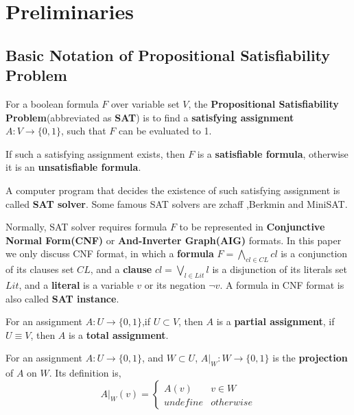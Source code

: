 \documentclass[journal]{IEEEtran}
\begin{document}
\section{Preliminaries}\label{sec_pre}

\subsection{Basic Notation of Propositional Satisfiability Problem}
For a boolean formula $F$ over variable set $V$,
the \textbf{Propositional Satisfiability Problem}(abbreviated as \textbf{SAT}) is to find a \textbf{satisfying assignment} $A:V\to \{0,1\}$,
such that $F$ can be evaluated to 1.

If such a satisfying assignment exists, then $F$ is a \textbf{satisfiable formula},
otherwise it is an \textbf{unsatisfiable formula}.

A computer program that decides the existence of such satisfying assignment is called \textbf{SAT solver}.
Some famous SAT solvers are zchaff\cite{CHAFF} ,Berkmin\cite{BERKMIN} and MiniSAT\cite{EXTSAT}.

Normally,
SAT solver requires formula $F$ to be represented in \textbf{Conjunctive Normal Form(CNF)} or \textbf{And-Inverter Graph(AIG)} formats.
In this paper we only discuss CNF format,
in which a \textbf{formula} $F=\bigwedge_{cl\in CL}cl$ is a conjunction of its clauses set $CL$,
and a \textbf{clause} $cl=\bigvee_{l\in Lit}l$ is a disjunction of its literals set $Lit$,
and a \textbf{literal} is a variable $v$ or its negation $\neg v$.
A formula in CNF format is also called \textbf{SAT instance}.

For an assignment $A:U\to \{0,1\}$,if $U\subset V$, then $A$ is a \textbf{partial assignment},
if $U\equiv V$, then $A$ is a \textbf{total assignment}.

For an assignment $A:U\to \{0,1\}$,
and $W\subset U$, $A|_W:W\to \{0,1\}$ is the \textbf{projection} of $A$ on $W$.
Its definition is,
\begin{displaymath}
A|_W(v)=\left\{ \begin{array}{ll}
A(v) & v\in W \\
undefine & otherwise
\end{array}
\right.
\end{displaymath}
\end{document}
